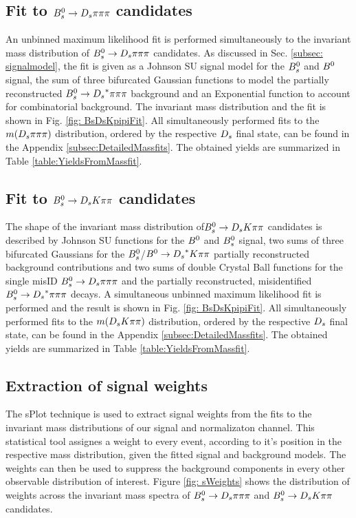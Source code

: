 \subsection{Fit to ${{B}^0_{s}}\rightarrow{\ensuremath{{D}_{s}}}{\ensuremath{\pi}}{\ensuremath{\pi}}{\ensuremath{\pi}}$ candidates}
\label{subsec: NormFit}

An unbinned maximum likelihood fit is performed simultaneously to the invariant mass distribution of ${{B}^0_{s}}\rightarrow{\ensuremath{{D}_{s}}}{\ensuremath{\pi}}{\ensuremath{\pi}}{\ensuremath{\pi}}$ candidates. 
As discussed in Sec. \ref{subsec: signalmodel}, the fit is given as a Johnson SU signal model for the ${{B}^0_{s}}$ and ${{B}^0}$ signal, the sum of three bifurcated Gaussian functions to model the partially reconstructed ${{B}^0_{s}}\rightarrow{\ensuremath{{D}_{s}}}^{*}{\pi}{\pi}{\pi}$ background and an Exponential function to account for combinatorial background. The invariant mass distribution and the fit is shown in Fig. \ref{fig: BsDsKpipiFit}. 
All simultaneously performed fits to the $m({{D}_{s}}{\pi}{\pi}{\pi})$ distribution, ordered by the respective ${{D}_{s}}$ final state, can be found in the Appendix \ref{subsec:DetailedMassfits}.   
The obtained yields are summarized in Table \ref{table:YieldsFromMassfit}. 


\subsection{Fit to ${{B}^0_{s}}\rightarrow{\ensuremath{{D}_{s}}}{\ensuremath{K}}{\ensuremath{\pi}}{\ensuremath{\pi}}$ candidates}
\label{subsec: SigFit}

The shape of the invariant mass distribution of${{B}^0_{s}}\rightarrow{\ensuremath{{D}_{s}}}{\ensuremath{K}}{\ensuremath{\pi}}{\ensuremath{\pi}}$ candidates is described by Johnson SU functions for the ${{B}^0}$ and ${{B}^0_{s}}$ signal, 
two sums of three bifurcated Gaussians for the ${{B}^0_{s}}$/${{B}^0}\rightarrow{\ensuremath{{D}_{s}}}^{*}{K}{\pi}{\pi}$ partially reconstructed background contributions and 
two sums of double Crystal Ball functions for the single misID ${{B}^0_{s}}\rightarrow{\ensuremath{{D}_{s}}}{\ensuremath{\pi}}{\ensuremath{\pi}}{\ensuremath{\pi}}$ and the partially reconstructed, misidentified ${{B}^0_{s}}\rightarrow{\ensuremath{{D}_{s}}}^{*}{\pi}{\pi}{\pi}$ decays. 
A simultaneous unbinned maximum likelihood fit is performed and the result is shown in Fig. \ref{fig: BsDsKpipiFit}.
All simultaneously performed fits to the $m({{D}_{s}}{K}{\pi}{\pi})$ distribution, ordered by the respective ${{D}_{s}}$ final state, can be found in the Appendix \ref{subsec:DetailedMassfits}.
The obtained yields are summarized in Table \ref{table:YieldsFromMassfit}.
 

\subsection{Extraction of signal weights}
\label{subsec: sWegihts}

The sPlot technique \cite{Pivk:2004ty} is used to extract signal weights from the fits to the invariant mass distributions of our signal and normalizaton channel. 
This statistical tool assignes a weight to every event, according to it's position in the respective mass distribution, given the fitted signal and background models. 
The weights can then be used to suppress the background components in every other observable distribution of interest.  
Figure \ref{fig: sWeights} shows the distribution of weights across the invariant mass spectra of ${{B}^0_{s}}\rightarrow{\ensuremath{{D}_{s}}}{\ensuremath{\pi}}{\ensuremath{\pi}}{\ensuremath{\pi}}$ and ${{B}^0_{s}}\rightarrow{\ensuremath{{D}_{s}}}{\ensuremath{K}}{\ensuremath{\pi}}{\ensuremath{\pi}}$ candidates.


